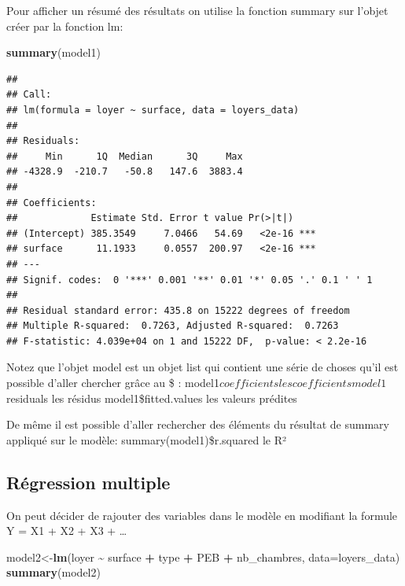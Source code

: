 \documentclass[
]{book}
\newenvironment{Shaded}{\begin{snugshade}}{\end{snugshade}}
\newcommand{\AttributeTok}[1]{\textcolor[rgb]{0.13,0.29,0.53}{#1}}
\newcommand{\FunctionTok}[1]{\textcolor[rgb]{0.13,0.29,0.53}{\textbf{#1}}}
\newcommand{\NormalTok}[1]{#1}
\newcommand{\OtherTok}[1]{\textcolor[rgb]{0.56,0.35,0.01}{#1}}
\newcommand{\SpecialCharTok}[1]{\textcolor[rgb]{0.81,0.36,0.00}{\textbf{#1}}}
\begin{document}
Pour afficher un résumé des résultats on utilise la fonction summary sur
l'objet créer par la fonction lm:

\begin{Shaded}
\begin{Highlighting}[]
\FunctionTok{summary}\NormalTok{(model1)}
\end{Highlighting}
\end{Shaded}

\begin{verbatim}
## 
## Call:
## lm(formula = loyer ~ surface, data = loyers_data)
## 
## Residuals:
##     Min      1Q  Median      3Q     Max 
## -4328.9  -210.7   -50.8   147.6  3883.4 
## 
## Coefficients:
##             Estimate Std. Error t value Pr(>|t|)    
## (Intercept) 385.3549     7.0466   54.69   <2e-16 ***
## surface      11.1933     0.0557  200.97   <2e-16 ***
## ---
## Signif. codes:  0 '***' 0.001 '**' 0.01 '*' 0.05 '.' 0.1 ' ' 1
## 
## Residual standard error: 435.8 on 15222 degrees of freedom
## Multiple R-squared:  0.7263, Adjusted R-squared:  0.7263 
## F-statistic: 4.039e+04 on 1 and 15222 DF,  p-value: < 2.2e-16
\end{verbatim}

Notez que l'objet model est un objet list qui contient une série de
choses qu'il est possible d'aller chercher grâce au \$ :
model1\(coefficients les coefficients model1\)residuals les résidus
model1\$fitted.values les valeurs prédites

De même il est possible d'aller rechercher des éléments du résultat de
summary appliqué sur le modèle: summary(model1)\$r.squared le R²

\hypertarget{ruxe9gression-multiple}{%
\subsection{Régression multiple}\label{ruxe9gression-multiple}}

On peut décider de rajouter des variables dans le modèle en modifiant la
formule Y = X1 + X2 + X3 + \ldots{}

\begin{Shaded}
\begin{Highlighting}[]
\NormalTok{model2}\OtherTok{\textless{}{-}}\FunctionTok{lm}\NormalTok{(loyer }\SpecialCharTok{\textasciitilde{}}\NormalTok{ surface }\SpecialCharTok{+}\NormalTok{  type }\SpecialCharTok{+}\NormalTok{ PEB }\SpecialCharTok{+}\NormalTok{ nb\_chambres, }\AttributeTok{data=}\NormalTok{loyers\_data)}
\FunctionTok{summary}\NormalTok{(model2)}
\end{Highlighting}
\end{Shaded}
\end{document}
